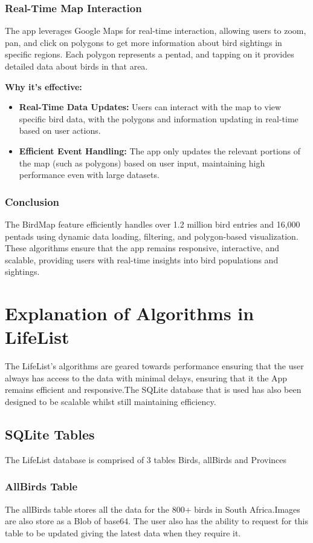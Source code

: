 \documentclass{article}
\begin{document}
\subsubsection{Real-Time Map Interaction}
The app leverages Google Maps for real-time interaction, allowing users to zoom, pan, and click on polygons to get more information about bird sightings in specific regions. Each polygon represents a pentad, and tapping on it provides detailed data about birds in that area.

\textbf{Why it's effective:}
\begin{itemize}
    \item \textbf{Real-Time Data Updates:} Users can interact with the map to view specific bird data, with the polygons and information updating in real-time based on user actions.
    \item \textbf{Efficient Event Handling:} The app only updates the relevant portions of the map (such as polygons) based on user input, maintaining high performance even with large datasets.
\end{itemize}

\subsubsection{Conclusion}
The BirdMap feature efficiently handles over 1.2 million bird entries and 16,000 pentads using dynamic data loading, filtering, and polygon-based visualization. These algorithms ensure that the app remains responsive, interactive, and scalable, providing users with real-time insights into bird populations and sightings.

\section{Explanation of Algorithms in LifeList}
The LifeList's algorithms are geared towards performance ensuring that the user always has access to the data with minimal delays, ensuring that it the App remains efficient and responsive.The SQLite database that is used has also been designed to be scalable whilst still maintaining efficiency. 

\subsection{SQLite Tables}
The LifeList database is comprised of 3 tables Birds, allBirds and Provinces

\subsubsection{AllBirds Table}
The allBirds table stores all the data for the 800+ birds in South Africa.Images are also store as a Blob of base64. The user also has the ability to request for this table to be updated giving the latest data when they require it.
\end{document}
